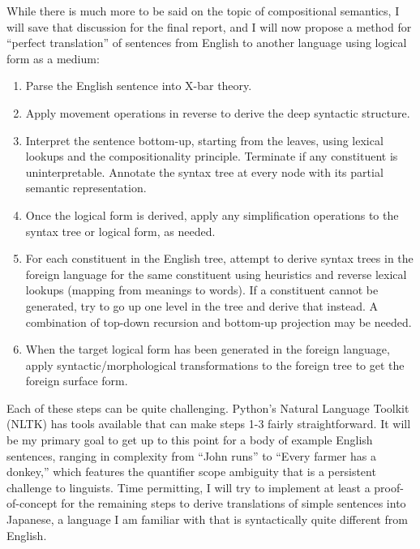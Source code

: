 \documentclass[11pt, oneside]{article}      %
\begin{document}
While there is much more to be said on the topic of compositional semantics, I will save that discussion for the final report, and I will now propose a method for ``perfect translation'' of sentences from English to another language using logical form as a medium:

\begin{enumerate}
\item Parse the English sentence into X-bar theory.
\item Apply movement operations in reverse to derive the deep syntactic structure.
\item Interpret the sentence bottom-up, starting from the leaves, using lexical lookups and the compositionality principle.  Terminate if any constituent is uninterpretable.  Annotate the syntax tree at every node with its partial semantic representation.
\item Once the logical form is derived, apply any simplification operations to the syntax tree or logical form, as needed.
\item For each constituent in the English tree, attempt to derive syntax trees in the foreign language for the same constituent using heuristics and reverse lexical lookups (mapping from meanings to words). If a constituent cannot be generated, try to go up one level in the tree and derive that instead. A combination of top-down recursion and bottom-up projection may be needed.
\item When the target logical form has been generated in the foreign language, apply syntactic/morphological transformations to the foreign tree to get the foreign surface form.
\end{enumerate}

Each of these steps can be quite challenging.  Python's Natural Language Toolkit (NLTK) has tools available that can make steps 1-3 fairly straightforward.  It will be my primary goal to get up to this point for a body of example English sentences, ranging in complexity from ``John runs'' to ``Every farmer has a donkey,'' which features the quantifier scope ambiguity that is a persistent challenge to linguists.  Time permitting, I will try to implement at least a proof-of-concept for the remaining steps to derive translations of simple sentences into Japanese, a language I am familiar with that is syntactically quite different from English.
\end{document}
